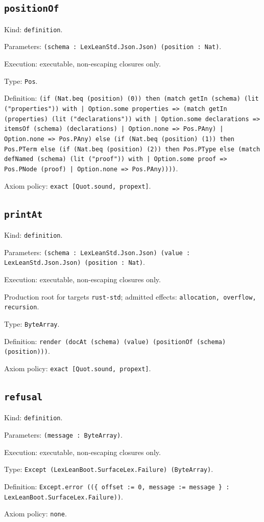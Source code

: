 \documentclass[11pt]{article}
\begin{document}
\subsection*{\texttt{positionOf}}
\noindent Kind: \texttt{definition}.\par
\noindent Parameters: \texttt{(schema : LexLeanStd.Json.Json) (position : Nat)}.\par
\noindent Execution: executable, non-escaping closures only.\par
\noindent Type: \texttt{Pos}.\par
\noindent Definition: \texttt{(if (Nat.beq (position) (0)) then (match getIn (schema) (lit ("properties")) with | Option.some properties => (match getIn (properties) (lit ("declarations")) with | Option.some declarations => itemsOf (schema) (declarations) | Option.none => Pos.PAny) | Option.none => Pos.PAny) else (if (Nat.beq (position) (1)) then Pos.PTerm else (if (Nat.beq (position) (2)) then Pos.PType else (match defNamed (schema) (lit ("proof")) with | Option.some proof => Pos.PNode (proof) | Option.none => Pos.PAny))))}.\par
\noindent Axiom policy: \texttt{exact [Quot.sound, propext]}.\par
\subsection*{\texttt{printAt}}
\noindent Kind: \texttt{definition}.\par
\noindent Parameters: \texttt{(schema : LexLeanStd.Json.Json) (value : LexLeanStd.Json.Json) (position : Nat)}.\par
\noindent Execution: executable, non-escaping closures only.\par
\noindent Production root for targets \texttt{rust-std}; admitted effects: \texttt{allocation, overflow, recursion}.\par
\noindent Type: \texttt{ByteArray}.\par
\noindent Definition: \texttt{render (docAt (schema) (value) (positionOf (schema) (position)))}.\par
\noindent Axiom policy: \texttt{exact [Quot.sound, propext]}.\par
\subsection*{\texttt{refusal}}
\noindent Kind: \texttt{definition}.\par
\noindent Parameters: \texttt{(message : ByteArray)}.\par
\noindent Execution: executable, non-escaping closures only.\par
\noindent Type: \texttt{Except (LexLeanBoot.SurfaceLex.Failure) (ByteArray)}.\par
\noindent Definition: \texttt{Except.error ((\{ offset := 0, message := message \} : LexLeanBoot.SurfaceLex.Failure))}.\par
\noindent Axiom policy: \texttt{none}.\par
\end{document}
